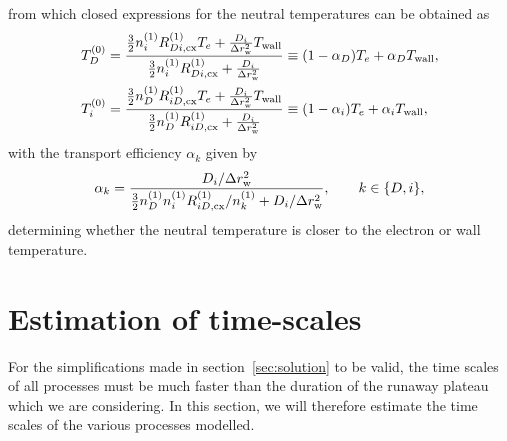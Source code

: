 \documentclass{notes}
\begin{document}
	from which closed expressions for the neutral temperatures can be obtained
	as
	\begin{equation}
		\begin{aligned}
			T_D^{(0)} &= \frac{
				\frac{3}{2}n_i^{(1)}R_{Di,\rm cx}^{(1)}T_e +
				\frac{D_i}{\Delta r_{\rm w}^2}T_{\rm wall}
			}{
				\frac{3}{2}n_i^{(1)}R_{Di,\rm cx}^{(1)} +
				\frac{D_i}{\Delta r_{\rm w}^2}
			}
			\equiv (1-\alpha_D) T_e + \alpha_D T_{\rm wall},\\
			T_i^{(0)} &= \frac{
				\frac{3}{2}n_D^{(1)}R_{iD,\rm cx}^{(1)}T_e +
				\frac{D_i}{\Delta r_{\rm w}^2}T_{\rm wall}
			}{
				\frac{3}{2}n_D^{(1)}R_{iD,\rm cx}^{(1)} +
				\frac{D_i}{\Delta r_{\rm w}^2}
			}
			\equiv (1-\alpha_i) T_e + \alpha_i T_{\rm wall},\\
		\end{aligned}
	\end{equation}
	with the transport efficiency $\alpha_k$ given by
	\begin{equation}
		\alpha_k = \frac{
			D_i/\Delta r_{\rm w}^2
		}{
			\frac{3}{2}n_D^{(1)}n_i^{(1)}R_{iD,\rm cx}^{(1)}/n_k^{(1)} +
			D_i/\Delta r_{\rm w}^2
		},
		\qquad k\in\{D, i\},
	\end{equation}
	determining whether the neutral temperature is closer to the electron or
	wall temperature.

	\section{Estimation of time-scales}
	For the simplifications made in section~\ref{sec:solution} to be valid, the
	time scales of all processes must be much faster than the duration of the
	runaway plateau which we are considering. In this section, we will therefore
	estimate the time scales of the various processes modelled.
\end{document}
